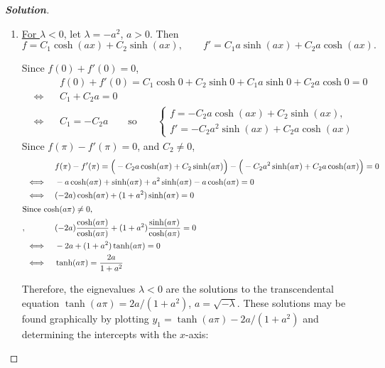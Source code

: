 \documentclass[a4paper,12pt]{article} %
\theoremstyle{plain}
\begin{document}
\begin{proof}[\textbf{Solution}] %
    \begin{enumerate}[label=\alph*.)]
        \item  \underline{For $\lambda < 0$}, let $\lambda = -a^2$, $a>0$. Then \begin{equation*}
        f = C_1 \cosh (a x) + C_2 \sinh (ax), \qquad f' =  C_1 a\sinh (a x) + C_2 a\cosh (ax).
        \end{equation*}
        
        Since $f(0) + f'(0) = 0$,
        \begin{align*}
            &&&f(0) + f'(0) = C_1 \cosh 0 + C_2 \sinh 0 + C_1 a \sinh 0 + C_2 a \cosh 0 = 0\\
            &\iff& &C_1 + C_2 a = 0 \\
            &\iff& &C_1 = -C_2 a  \qquad \text{so}\qquad \begin{cases}
                f=-C_2 a \cosh (ax) + C_2 \sinh(ax),\\
                f'=-C_2 a^2 \sinh(ax) + C_2 a \cosh(ax)
            \end{cases}
        \end{align*}
        Since $f(\pi) -f'(\pi) = 0$, and $C_2 \neq 0$,
        \begin{align*}
            && &f(\pi) - f'(\pi) = \Big(-C_2a \cosh (a\pi) + C_2 \sinh (a\pi)\Big) - \Big(-  C_2a^2\sinh (a \pi) + C_2 a\cosh (a\pi)\Big) =0 \\
            &\iff&& -a \cosh(a\pi) + \sinh(a\pi) + a^2 \sinh(a\pi) - a \cosh(a\pi) = 0\\
            &\iff&& (-2a)\cosh(a\pi) + (1+a^2)\sinh(a\pi) = 0\\
            \intertext{Since $\cosh(a\pi) \neq 0$,},
            &&&(-2a)\frac{\cosh(a\pi)}{\cosh(a\pi)} + (1+a^2)\frac{\sinh(a\pi)}{\cosh(a\pi)} = 0 \\
            &\iff& &-2a+(1+a^2)\tanh(a\pi) = 0 \\
            &\iff&& \tanh (a\pi) = \frac{2a}{1+a^2}
        \end{align*}
        
        Therefore, the eignevalues $\lambda <0$ are the solutions to the transcendental equation $\tanh (a\pi) = 2a/(1+a^2)$, $a=\sqrt{-\lambda}$. These solutions may be found graphically by plotting $y_1 = \tanh (a\pi) - 2a/(1+a^2)$ and determining the intercepts with the $x$-axis:
        \begin{center}
\end{center}
\end{enumerate}
\end{proof}
\end{document}

